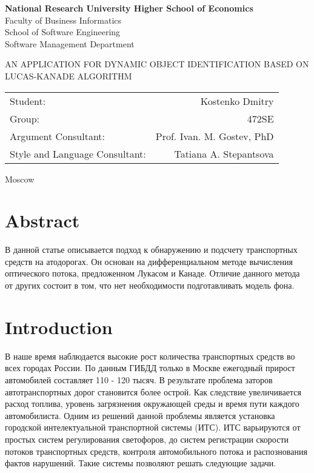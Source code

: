 \documentclass[12pt,a4paper,oneside,titlepage]{article}
\author{Kostenko}
\begin{document}
{
\thispagestyle{empty}
\newpage
\centering

\textbf{
National Research University Higher School of Economics\\
}
Faculty of Business Informatics\\
School of Software Engineering\\
Software Management Department

\vfill


\begin{large}
\MakeTextUppercase{
An Application for Dynamic Object Identification Based on Lucas-Kanade Algorithm
}
\end{large}


\vfill

\begin{tabular}{lr}
Student: & Kostenko Dmitry \\
Group: & 472SE \\
Argument Consultant: & Prof. Ivan. M. Gostev, PhD \\
Style and Language Consultant: & Tatiana A. Stepantsova
\end{tabular}

\vspace{\fill}

Moscow\\ \number\year
\clearpage
}

\section*{Abstract}
{
В данной статье описывается подход к обнаружению и подсчету транспортных средств на атодорогах.
Он основан на дифференциальном методе вычисления оптического потока, предложенном Лукасом и Канаде.
Отличие данного метода от других состоит в том, что нет необходимости подготавливать модель фона.
}


{
\newpage
\centering
\tableofcontents
}


\newpage
\section*{Introduction}
В наше время наблюдается высокие рост количества транспортных средств во всех городах России.
По данным ГИБДД только в Москве ежегодный прирост автомобилей составляет 110 - 120 тысяч.
В результате проблема заторов автотранспортных дорог становится более острой.
Как следствие увеличивается расход топлива, уровень загрязнения окружающей среды и время пути каждого автомобилиста.
Одним из решений данной проблемы является установка городской интелектуальной транспортной системы (ИТС).
ИТС варьируются от простых систем регулирования светофоров, до систем регистрации скорости потоков транспортных средств, контроля автомобильного потока и распознования фактов нарушений.
Такие системы позволяют решать следующие задачи.
\end{document}
